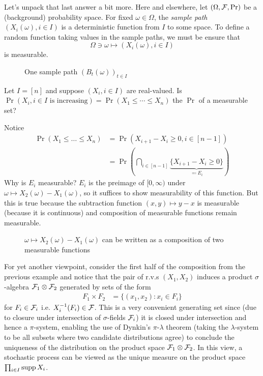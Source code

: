 Let's unpack that last answer a bit more.
Here and elsewhere, let $(\Omega, \mathcal{F}, \Pr)$ be a (background) probability space.
For fixed $\omega \in \Omega$, the \emph{sample path}
$(X_i(\omega), i \in I)$ is a deterministic function
from $I$ to some space. To define a random function
taking values in the sample paths, we must be ensure that
\[
  \Omega \ni \omega \mapsto (X_i(\omega), i \in I)
\]
is measurable.

\begin{figure}[ht]
  \centering
  \caption{One sample path $(B_t(\omega))_{t \in I}$}
  \label{fig:1-21-1}
\end{figure}

\begin{example}
  Let $I = [n]$ and suppose $(X_i, i \in I)$ are real-valued.
  Is
  $\Pr(X_i, i \in I \text{ is increasing}) = \Pr(X_1 \leq \cdots \leq X_n)$
  the $\Pr$ of a measurable set?

  Notice
  \begin{align*}
    \Pr(X_1 \leq \ldots \leq X_n)
    &= \Pr(X_{i+1} - X_i \geq 0, i \in [n-1]) \\
    &= \Pr\left(
      \bigcap_{i \in [n-1]}
      \underbrace{\{X_{i+1} - X_i \geq 0\}}_{\eqqcolon E_i}
    \right)
  \end{align*}
  Why is $E_i$ measurable?
  $E_i$ is the preimage of $[0, \infty)$ under
  $\omega \mapsto X_2(\omega) - X_1(\omega)$,
  so it suffices to show measurability of this function.
  But this is true because the subtraction function $(x,y) \mapsto y - x$ is
  measurable (because it is continuous) and composition of measurable functions
  remain measurable.

  \begin{figure}[H]
    \centering
    \caption{
      $\omega \mapsto X_2(\omega) - X_1(\omega)$
      can be written as a composition of two measurable functions
    }
    \label{fig:1-21-2}
  \end{figure}
\end{example}

For yet another viewpoint, consider the first half of the composition from the
previous example and notice that the pair of r.v.s $(X_1, X_2)$ induces a
product $\sigma$-algebra $\mathcal{F}_1 \otimes \mathcal{F}_2$ generated by sets of the form
\begin{align}
  F_1 \times F_2
    &= \{(x_1, x_2) : x_i \in F_i \}
\end{align}
for $F_i \in \mathcal{F}_i$ i.e. $X_i^{-1}(F_i) \in \mathcal{F}$.
This is a very convenient generating set since (due to closure under
intersection of $\sigma$-fields $\mathcal{F}_i$) it is closed under intersection and
hence a $\pi$-system, enabling the use of Dynkin's $\pi$-$\lambda$ theorem
(taking the $\lambda$-system to be all subsets where two candidate
distributions agree) to conclude the uniqueness of the distribution on the
product space $\mathcal{F}_1 \otimes \mathcal{F}_2$. In this view, a stochastic process
can be viewed as the unique measure on the product space
$\prod_{i \in I} \operatorname{supp} X_i$.

